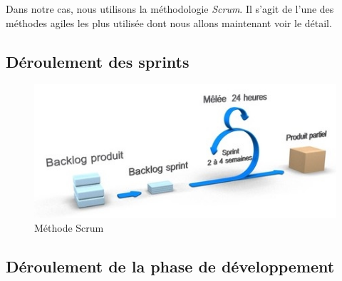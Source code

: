 	Dans notre cas, nous utilisons la méthodologie \textit{Scrum}. Il s'agit de l'une des méthodes agiles les plus utilisée dont nous allons maintenant voir le détail.

\subsection{Déroulement des sprints}

\begin{figure}[h!]
	\includegraphics[scale=0.7]{images/travailBP1818/scrum.jpg}
	\centering
	\caption{Méthode Scrum}
	\label{scrum}
\end{figure}

\subsection{Déroulement de la phase de développement}